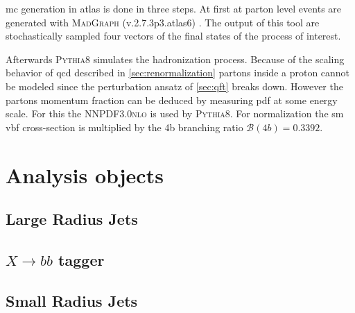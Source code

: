 \ac{mc} generation in \ac{atlas} is done in three steps. At first at parton level events are generated with \textsc{MadGraph} (v.2.7.3p3.atlas6) \citep{alwall2014automated}. The output of this tool are stochastically sampled four vectors of the final states of the process of interest.

Afterwards \textsc{Pythia8} \citep{Sjostrand:2014zea} simulates the hadronization process. Because of the scaling behavior of \ac{qcd} described in \ref{sec:renormalization} partons inside a proton cannot be modeled since the perturbation ansatz of \ref{sec:qft} breaks down. However the partons momentum fraction can be deduced by measuring \ac{pdf} at some energy scale. For this the \textsc{NNPDF3.0nlo} is used by \textsc{Pythia8}. For normalization the \ac{sm} \ac{vbf} cross-section is multiplied by the 4b branching ratio $\mathcal{B}(4b)=0.3392$.




\section{Analysis objects}
\subsection{Large Radius Jets}
\subsection{$X\rightarrow bb$ tagger}



\subsection{Small Radius Jets}

